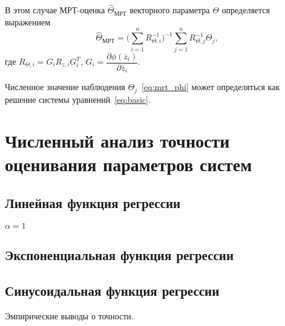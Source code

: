 В этом случае МРТ-оценка \( \hat{\Theta}_{\text{МРТ}} \) векторного параметра \( \Theta \)
определяется выражением
\begin{equation}
  \label{eq:nonlinear_mrt}
  \hat{\Theta}_{\text{МРТ}} =
  \Bigg( \sum^{n}_{i=1} R^{-1}_{\Theta,i} \Bigg)^{-1}
  \sum^{n}_{j=1} R^{-1}_{\Theta,j} \Theta_j,
\end{equation}
\hspace{1.6mm} где
\( R_{\Theta,i} = G_i R_{z,i} G^T_i \),
\( G_i =
\dfrac{\partial \phi( \overline{z}_{i} ) }{ \partial \overline{z}_{i} } \).

Численное значение наблюдения \( \Theta_j \)~\eqref{eq:mrt_phi} может определяться как
решение системы уравнений~\eqref{eq:basic}.


\section{Численный анализ точности оценивания параметров систем}

\subsection{Линейная функция регрессии}

\( \alpha = 1 \)

\subsection{Экспоненциальная функция регрессии}

\subsection{Синусоидальная функция регрессии}

Эмпирические выводы о точности.